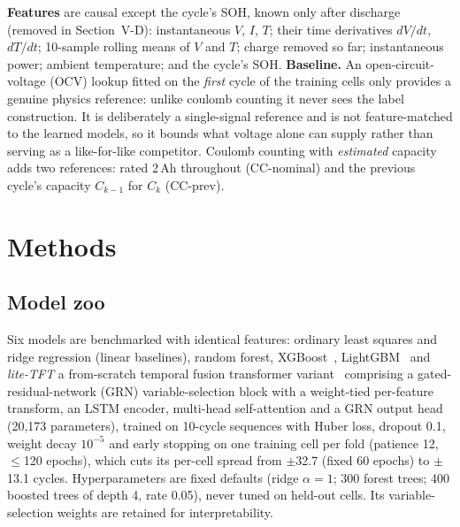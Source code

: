 \documentclass[conference,a4paper]{IEEEtran}
\begin{document}
\textbf{Features} are causal except the cycle's SOH, known only after
discharge (removed in Section~V-D): instantaneous $V$, $I$, $T$; their
time derivatives $dV/dt$, $dT/dt$; 10-sample rolling means of $V$ and $T$;
charge removed so far; instantaneous power; ambient temperature; and the
cycle's SOH. \textbf{Baseline.} An open-circuit-voltage (OCV) lookup fitted
on the \emph{first} cycle of the training cells only provides a genuine
physics reference: unlike coulomb counting it never sees the label
construction. It is deliberately a single-signal reference and is not
feature-matched to the learned models, so it bounds what voltage alone
can supply rather than serving as a like-for-like competitor. Coulomb
counting with \emph{estimated} capacity adds two references: rated 2\,Ah
throughout (CC-nominal) and the previous cycle's capacity $C_{k-1}$ for $C_k$
(CC-prev).

\section{Methods}
\subsection{Model zoo}
Six models are benchmarked with identical features: ordinary
least squares and ridge regression (linear baselines), random forest,
XGBoost~\cite{chen2016}, LightGBM~\cite{ke2017} and \emph{lite-TFT} a
from-scratch temporal fusion transformer variant~\cite{lim2021} comprising a
gated-residual-network (GRN) variable-selection block with a weight-tied
per-feature transform, an LSTM encoder, multi-head self-attention and a GRN
output head (20{,}173 parameters), trained on 10-cycle sequences with Huber
loss, dropout 0.1, weight decay $10^{-5}$ and early stopping on one training
cell per fold (patience 12, $\leq$120 epochs), which cuts its per-cell spread
from $\pm$32.7 (fixed 60 epochs) to $\pm$13.1 cycles. Hyperparameters are fixed
defaults (ridge $\alpha=1$; 300 forest trees; 400 boosted trees of depth 4,
rate 0.05), never tuned on held-out cells. Its variable-selection weights are retained for
interpretability.
\end{document}

